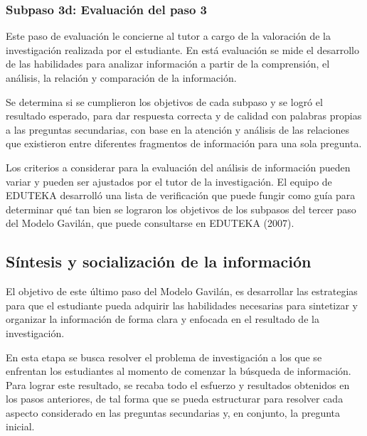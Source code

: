 
\subsubsection{Subpaso 3d: Evaluación del paso 3}
\label{secPaso3dCap2}

Este paso de evaluación le concierne al tutor a cargo de la valoración de la investigación realizada por el estudiante. En está evaluación se mide el desarrollo de las habilidades para analizar información a partir de la comprensión, el análisis, la relación y comparación de la información.

Se determina si se cumplieron los objetivos de cada subpaso y se logró el resultado esperado, para dar respuesta correcta y de calidad con palabras propias a las preguntas secundarias, con base en la atención y análisis de las relaciones que existieron entre diferentes fragmentos de información para una sola pregunta.

Los criterios a considerar para la evaluación del análisis de información pueden variar y pueden ser ajustados por el tutor de la investigación. El equipo de EDUTEKA desarrolló una lista de verificación que puede fungir como guía para determinar qué tan bien se lograron los objetivos de los subpasos del tercer paso del Modelo Gavilán, que puede consultarse en EDUTEKA (2007).


\subsection{Síntesis y socialización de la información}
\label{secPaso4Cap2}

El objetivo de este último paso del Modelo Gavilán, es desarrollar las estrategias para que el estudiante pueda adquirir las habilidades necesarias para sintetizar y organizar la información de forma clara y enfocada en el resultado de la investigación.

En esta etapa se busca resolver el problema de investigación a los que se enfrentan los estudiantes al momento de comenzar la búsqueda de información. Para lograr este resultado, se recaba todo el esfuerzo y resultados obtenidos en los pasos anteriores, de tal forma que se pueda estructurar para resolver cada aspecto considerado en las preguntas secundarias y, en conjunto, la pregunta inicial.


